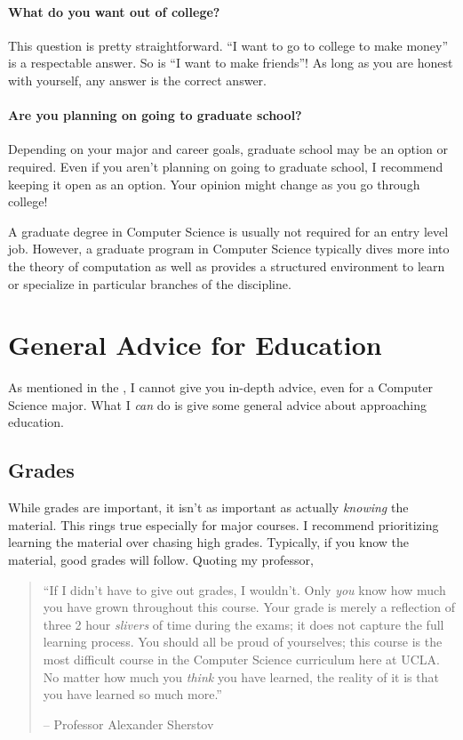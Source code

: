 \documentclass[12pt]{article}
\newenvironment{example}{
\begin{tcolorbox}[title=Example, colback=blue!5!white, colframe=black!75!blue]
}{ \end{tcolorbox} }
\renewcommand{\it}[1]{\textit{{#1}}}
\renewcommand{\bf}[1]{\textbf{{#1}}}
\begin{document}
\paragraph{What do you want out of college?} This question is pretty
straightforward. ``I want to go to college to make money'' is a respectable
answer. So is ``I want to make friends''! As long as you are honest with
yourself, any answer is the correct answer.

\paragraph{Are you planning on going to graduate school?} Depending on your
major and career goals, graduate school may be an option or required. Even if
you aren't planning on going to graduate school, I recommend keeping it open as
an option. Your opinion might change as you go through college!
\begin{example}
  A graduate degree in Computer Science is usually not required for an entry
  level job. However, a graduate program in Computer Science typically dives
  more into the theory of computation as well as provides a structured
  environment to learn or specialize in particular branches of the discipline.
\end{example}


\section{General Advice for Education}
As mentioned in the \bf{}, I cannot give you in-depth
advice, even for a Computer Science major. What I \it{can} do is give some
general advice about approaching education.

\subsection{Grades}
While grades are important, it isn't as important as actually \it{knowing} the
material. This rings true especially for  major courses. I recommend
prioritizing learning the material over chasing high grades. Typically, if you
know the material, good grades will follow. Quoting my professor,
\begin{quote}
  ``If I didn't have to give out grades, I wouldn't. Only \it{you} know how much
  you have grown throughout this course. Your grade is merely a reflection of
  three 2 hour \it{slivers} of time during the exams; it does not capture the
  full learning process. You should all be proud of yourselves; this course is
  the most difficult course in the Computer Science curriculum here at UCLA. No
  matter how much you \it{think} you have learned, the reality of it is that you
  have learned so much more.''
  \vspace{-1em}
  \begin{flushright}
    -- Professor Alexander Sherstov
  \end{flushright}
\end{quote}
\end{document}
